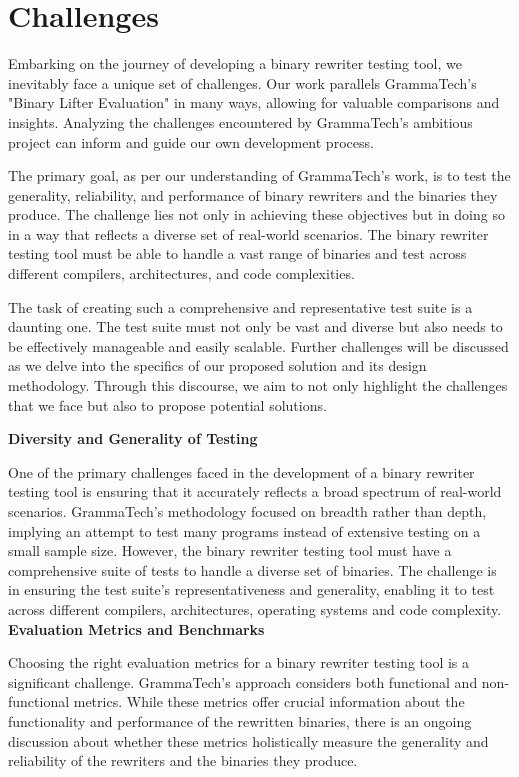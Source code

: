 \documentclass[a4paper,11pt,oneside]{report}
\begin{document}
\chapter{Challenges}

\setlength{\parindent}{4em}
Embarking on the journey of developing a binary rewriter testing tool, we inevitably
face a unique set of challenges. Our work parallels GrammaTech's "Binary Lifter Evaluation"
in many ways, allowing for valuable comparisons and insights. Analyzing the challenges
encountered by GrammaTech's ambitious project can inform and guide our own
development process.

The primary goal, as per our understanding of GrammaTech's work, is to test the
generality, reliability, and performance of binary rewriters and the binaries they produce.
The challenge lies not only in achieving these objectives but in doing so in a way that reflects
a diverse set of real-world scenarios. The binary rewriter testing tool must be able to handle
a vast range of binaries and test across different compilers, architectures, and code
complexities.

The task of creating such a comprehensive and representative test suite is a daunting
one. The test suite must not only be vast and diverse but also needs to be effectively
manageable and easily scalable. Further challenges will be discussed as we delve into the
specifics of our proposed solution and its design methodology. Through this discourse, we
aim to not only highlight the challenges that we face but also to propose potential solutions.

\textbf{Diversity and Generality of Testing}

One of the primary challenges faced in the development of a binary rewriter testing
tool is ensuring that it accurately reflects a broad spectrum of real-world scenarios.
GrammaTech's methodology focused on breadth rather than depth, implying an attempt to
test many programs instead of extensive testing on a small sample size. However, the binary
rewriter testing tool must have a comprehensive suite of tests to handle a diverse set of
binaries. The challenge is in ensuring the test suite's representativeness and generality,
enabling it to test across different compilers, architectures, operating systems and code
complexity. \\

\textbf{Evaluation Metrics and Benchmarks}

Choosing the right evaluation metrics for a binary rewriter testing tool is a significant
challenge. GrammaTech's approach considers both functional and non-functional metrics.
While these metrics offer crucial information about the functionality and performance of
the rewritten binaries, there is an ongoing discussion about whether these metrics
holistically measure the generality and reliability of the rewriters and the binaries they
produce.
\end{document}
